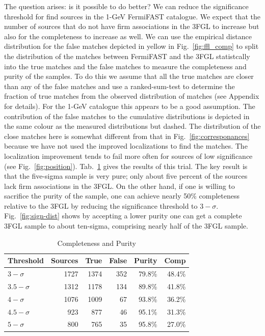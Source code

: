 \documentclass[useAMS,usenatbib]{mn2e}
\begin{document}
The question arises: is it possible to do better? We can reduce the
significance threshold for find sources in the 1-GeV FermiFAST
catalogue.  We expect that the number of sources that do not have firm
associations in the 3FGL to increase but also for the completeness to
increase as well.  We can use the empirical distance distribution for
the false matches depicted in yellow in Fig.~\ref{fig:ffl_comp} to
split the distribution of the matches between FermiFAST and the 3FGL
statistcally into the true matches and the false matches to measure
the completeness and purity of the samples.  To do this we assume that
all the true matches are closer than any of the false matches and
use a ranked-sum-test to determine the fraction of true matches
from the observed distribution of matches (see Appendix for details).  For
the 1-GeV catalogue this appears to be a good assumption.  The
contribution of the false matches to the cumulative distributions is
depicted in the same colour as the measured distributions but dashed.
The distribution of the close matches here is somewhat different from that
in Fig.~\ref{fig:corresponances} because we have not used the improved
localizations to find the matches.  The localization improvement tends
to fail more often for sources of low significance (see
Fig.~\ref{fig:position}).  Tab.~\ref{tab:comppure} gives the results
of this trial.  The key result is that the five-sigma sample is very
pure; only about five percent of the sources lack firm associations in
the 3FGL.  On the other hand, if one is willing to sacrifice the
purity of the sample, one can achieve nearly 50\% completeness
relative to the 3FGL by reducing the significance threshold to
$3-\sigma$.  Fig.~\ref{fig:sign-dist} shows by accepting a lower
purity one can get a complete 3FGL sample to about ten-sigma,
comprising nearly half of the 3FGL sample.
\begin{table}
  \caption{Completeness and Purity}
  \label{tab:comppure}
  \begin{tabular}{l|rrrrr}
    \hline
    Threshold & \multicolumn{1}{c}{Sources} & \multicolumn{1}{c}{True} & \multicolumn{1}{c}{False} & \multicolumn{1}{c}{Purity} & \multicolumn{1}{c}{Comp} \\
    \hline
    $3-\sigma$   & 1727 & 1374 & 352 & 79.8\% & 48.4\% \\
    $3.5-\sigma$ & 1312 & 1178 & 134 & 89.8\% & 41.8\% \\
    $4-\sigma$   & 1076 & 1009 &  67 & 93.8\% & 36.2\% \\
    $4.5-\sigma$ &  923 &  877 &  46 & 95.1\% & 31.3\% \\
    $5-\sigma$   &  800 &  765 &  35 & 95.8\% & 27.0\%  
  \end{tabular}
\end{table}
\end{document}
